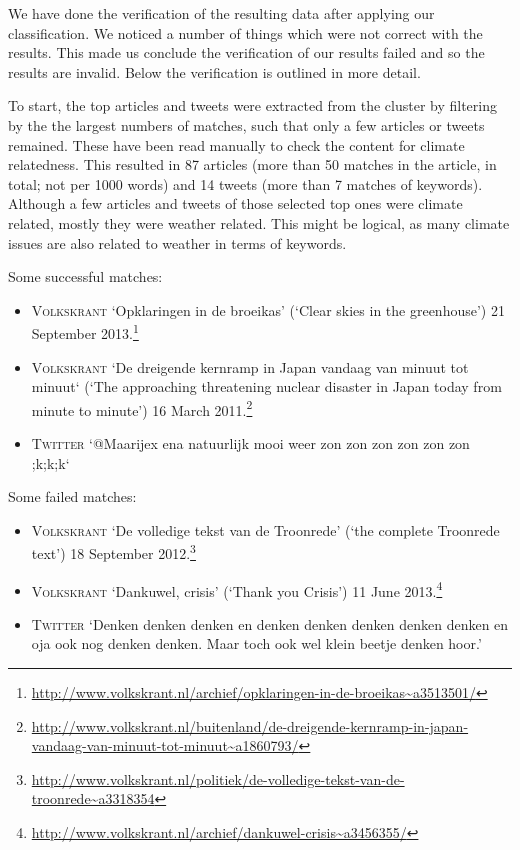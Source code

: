 \documentclass[paper=a4, fontsize=9px]{scrartcl} %
\numberwithin{equation}{section} %
\numberwithin{figure}{section} %
\numberwithin{table}{section} %
\begin{document}
\begin{multicols}{2}
We have done the verification of the resulting data after applying our classification. We noticed a number of things which were not correct with the results. This made us conclude the verification of our results failed and so the results are invalid. Below the verification is outlined in more detail.

To start, the top articles and tweets were extracted from the cluster by filtering by the the largest numbers of matches, such that only a few articles or tweets remained. These have been read manually to check the content for climate relatedness. This resulted in 87 articles (more than 50 matches in the article, in total; not per 1000 words) and 14 tweets (more than 7 matches of keywords). Although a few articles and tweets of those selected top ones were climate related, mostly they were weather related. This might be logical, as many climate issues are also related to weather in terms of keywords.

Some successful matches: 
\begin{itemize}
	\item \textsc{Volkskrant} `Opklaringen in de broeikas’ (`Clear skies in the greenhouse’) 21 September 2013.\footnote{\url{http://www.volkskrant.nl/archief/opklaringen-in-de-broeikas~a3513501/}}
	\item \textsc{Volkskrant} `De dreigende kernramp in Japan vandaag van minuut tot minuut` (`The approaching threatening nuclear disaster in Japan today from minute to minute’) 16 March 2011.\footnote{\url{http://www.volkskrant.nl/buitenland/de-dreigende-kernramp-in-japan-vandaag-van-minuut-tot-minuut~a1860793/}}
	\item \textsc{Twitter} `@Maarijex  ena natuurlijk mooi weer zon zon zon zon zon zon ;k;k;k`
\end{itemize}

Some failed matches:
\begin{itemize}
	\item \textsc{Volkskrant} `De volledige tekst van de Troonrede’ (`the complete Troonrede text’) 18 September 2012.\footnote{\url{http://www.volkskrant.nl/politiek/de-volledige-tekst-van-de-troonrede~a3318354}}
	\item \textsc{Volkskrant} `Dankuwel, crisis’ (`Thank you Crisis’) 11 June 2013.\footnote{\url{http://www.volkskrant.nl/archief/dankuwel-crisis~a3456355/}}
	\item \textsc{Twitter} `Denken denken denken en denken denken denken denken denken en oja ook nog denken denken. Maar toch ook wel klein beetje denken hoor.’


\end{itemize}
\end{multicols}
\end{document}
